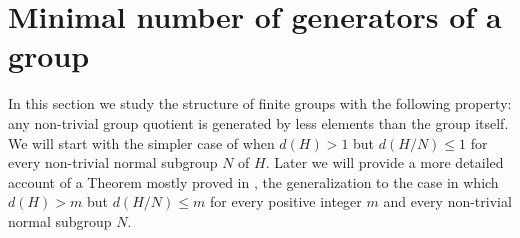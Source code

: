 \chapter{Minimal number of generators of a group}

In this section we study the structure of finite groups with the following property: any non-trivial group quotient is generated by less elements than the group itself. 
We will start with the simpler case of when $d(H) > 1$ but $d(H/N) \le 1$ for every non-trivial normal subgroup $N$ of $H$. 
Later we will provide a more detailed account of a Theorem mostly proved in \cite{DallaVoltaFGNMGAPQ}, the generalization to the case in which $d(H) > m$ but $d(H/N) \le m$ for every positive integer $m$ and every non-trivial normal subgroup $N$.



